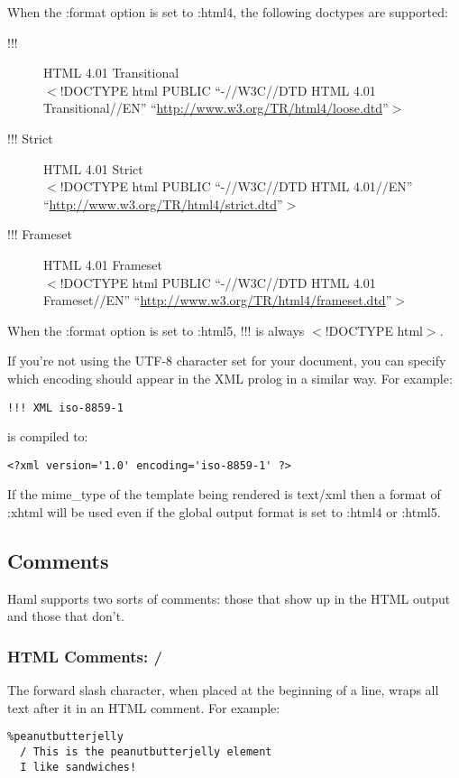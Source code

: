 \documentclass[10pt]{article}
\begin{document}
 When the :format option is set to :html4, the following doctypes are supported:
\begin{description}
\item[!!!]HTML 4.01 Transitional\\ 
$<$!DOCTYPE html PUBLIC ``-//W3C//DTD HTML 4.01 Transitional//EN'' ``\url{http://www.w3.org/TR/html4/loose.dtd}''$>$
\item[!!! Strict]HTML 4.01 Strict\\ 
$<$!DOCTYPE html PUBLIC ``-//W3C//DTD HTML 4.01//EN'' ``\url{http://www.w3.org/TR/html4/strict.dtd}''$>$
\item[!!! Frameset]HTML 4.01 Frameset\\ 
$<$!DOCTYPE html PUBLIC ``-//W3C//DTD HTML 4.01 Frameset//EN'' ``\url{http://www.w3.org/TR/html4/frameset.dtd}''$>$

\end{description}


 When the :format option is set to :html5, !!! is always $<$!DOCTYPE html$>$.


 If you’re not using the UTF-8 character set for your document, you can specify which encoding should appear in the XML prolog in a similar way. For example:
\begin{verbatim}
!!! XML iso-8859-1
\end{verbatim}


 is compiled to:
\begin{verbatim}
<?xml version='1.0' encoding='iso-8859-1' ?>
\end{verbatim}


 If the mime\_type of the template being rendered is text/xml then a format of :xhtml will be used even if the global output format is set to :html4 or :html5.
\subsection*{Comments}


 Haml supports two sorts of comments: those that show up in the HTML output and those that don’t.
\subsubsection*{HTML Comments: /}


 The forward slash character, when placed at the beginning of a line, wraps all text after it in an HTML comment. For example:
\begin{verbatim}
%peanutbutterjelly
  / This is the peanutbutterjelly element
  I like sandwiches!
\end{verbatim}
\end{document}
